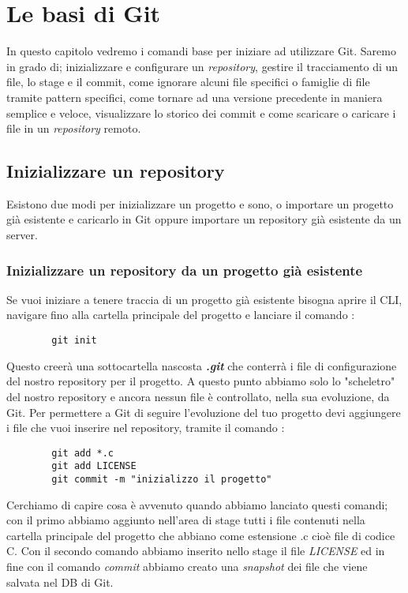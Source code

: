 \chapter{Le basi di Git}
In questo capitolo vedremo i comandi base per iniziare ad utilizzare Git. Saremo in grado di; inizializzare e configurare un \textit{repository}, gestire il tracciamento di un file, lo stage e il commit, come ignorare alcuni file specifici o famiglie di file tramite pattern specifici, come tornare ad una versione precedente in maniera semplice e veloce, visualizzare lo storico dei commit e come scaricare o caricare i file in un \textit{repository} remoto.
\section{Inizializzare un repository}
Esistono due modi per inizializzare un progetto e sono, o importare un progetto già esistente e caricarlo in Git oppure importare un repository già esistente da un server.
\subsection{Inizializzare un repository da un progetto già esistente }
Se vuoi iniziare a tenere traccia di un progetto già esistente bisogna aprire il CLI, navigare fino alla cartella principale del progetto e lanciare il comando :
\begin{lstlisting}
		git init
\end{lstlisting}
Questo creerà una sottocartella nascosta \textbf{\textit{.git}} che conterrà i file di configurazione del nostro repository per il progetto. A questo punto abbiamo solo lo "scheletro" del nostro repository e ancora nessun file è controllato, nella sua evoluzione, da Git.
Per permettere a Git di seguire l'evoluzione del tuo progetto devi aggiungere i file che vuoi inserire nel repository, tramite il comando :
\begin{lstlisting}
		git add *.c
		git add LICENSE
		git commit -m "inizializzo il progetto"
\end{lstlisting}
Cerchiamo di capire cosa è avvenuto quando abbiamo lanciato questi comandi; con il primo abbiamo aggiunto nell'area di stage tutti i file contenuti nella cartella principale del progetto che abbiano come estensione .c cioè file di codice C.
Con il secondo comando abbiamo inserito nello stage il file \textit{LICENSE} ed in fine con il comando \textit{commit} abbiamo creato una \textit{snapshot} dei file che viene salvata nel DB di Git.
